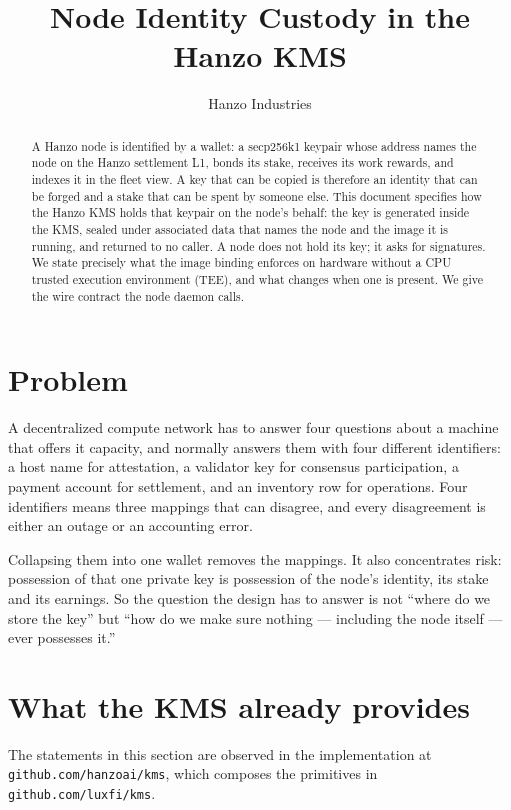 \documentclass[11pt,a4paper]{article}
\title{Node Identity Custody in the Hanzo KMS}
\author{Hanzo Industries}
\date{}
\newcommand{\code}[1]{\texttt{#1}}
\begin{document}
\maketitle

\begin{abstract}
A Hanzo node is identified by a wallet: a secp256k1 keypair whose address names
the node on the Hanzo settlement L1, bonds its stake, receives its work rewards,
and indexes it in the fleet view. A key that can be copied is therefore an
identity that can be forged and a stake that can be spent by someone else. This
document specifies how the Hanzo KMS holds that keypair on the node's behalf:
the key is generated inside the KMS, sealed under associated data that names the
node and the image it is running, and returned to no caller. A node does not
hold its key; it asks for signatures. We state precisely what the image binding
enforces on hardware without a CPU trusted execution environment (TEE), and what
changes when one is present. We give the wire contract the node daemon calls.
\end{abstract}

\section{Problem}

A decentralized compute network has to answer four questions about a machine
that offers it capacity, and normally answers them with four different
identifiers: a host name for attestation, a validator key for consensus
participation, a payment account for settlement, and an inventory row for
operations. Four identifiers means three mappings that can disagree, and every
disagreement is either an outage or an accounting error.

Collapsing them into one wallet removes the mappings. It also concentrates
risk: possession of that one private key is possession of the node's identity,
its stake and its earnings. So the question the design has to answer is not
``where do we store the key'' but ``how do we make sure nothing --- including
the node itself --- ever possesses it.''

\section{What the KMS already provides}

The statements in this section are observed in the implementation at
\code{github.com/hanzoai/kms}, which composes the primitives in
\code{github.com/luxfi/kms}.
\end{document}
